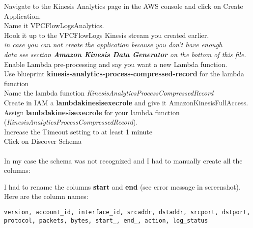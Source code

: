 Navigate to the Kinesis Analytics page in the AWS console and click on Create Application.\\
\hspace*{1cm} Name it VPCFlowLogsAnalytics.\\
\hspace*{1cm} Hook it up to the VPCFlowLogs Kinesis stream you created earlier.\\
\hspace*{1cm} \textit{in case you can not create the application because you don't have enough\\
\hspace*{1cm} data see section \textbf{Amazon Kinesis Data Generator} on the bottom of this file.}\\
\hspace*{1cm} Enable Lambda pre-processing and say you want a new Lambda function. \\
\hspace*{2cm} Use blueprint \textbf{kinesis-analytics-process-compressed-record} for the lambda function\\
\hspace*{2cm} Name the lambda function \textit{KinesisAnalyticsProcessCompressedRecord}\\
\hspace*{2cm} Create in IAM a \textbf{lambda\textunderscore kinesis\textunderscore exec\textunderscore role} and give it AmazonKinesisFullAccess.\\
\hspace*{2cm} Assign  \textbf{lambda\textunderscore kinesis\textunderscore exec\textunderscore role} for your lambda function (\textit{KinesisAnalyticsProcessCompressedRecord}).\\
\hspace*{2cm} Increase the Timeout setting to at least 1 minute\\
\hspace*{1cm}Click on Discover Schema\\
\\
In my case the schema was not recognized and I had to manually create all the columns:


I had to rename the columns \textbf{start} and \textbf{end} (see error message in screenshot).
Here are the column names: 

\begin{lstlisting}[numbers=none]
version, account_id, interface_id, srcaddr, dstaddr, srcport, dstport, protocol, packets, bytes, start_, end_, action, log_status
\end{lstlisting}

